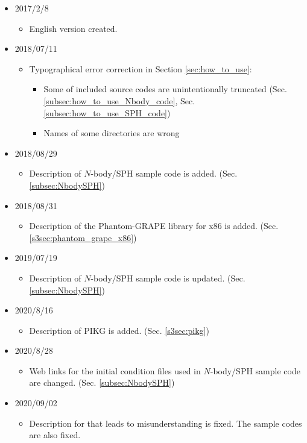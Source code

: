 \begin{itemize}
\item 2017/2/8
  \begin{itemize}
  \item English version created.
  \end{itemize}
\item 2018/07/11
  \begin{itemize}
  \item Typographical error correction in Section \ref{sec:how_to_use}:
    \begin{itemize}
    \item Some of included source codes are unintentionally truncated (Sec. \ref{subsec:how_to_use_Nbody_code}, Sec. \ref{subsec:how_to_use_SPH_code})
    \item Names of some directories are wrong
    \end{itemize}
  \end{itemize}
\item 2018/08/29
  \begin{itemize}
  \item Description of $N$-body/SPH sample code is added. (Sec. \ref{subsec:NbodySPH})
  \end{itemize}
\item 2018/08/31
  \begin{itemize}
  \item Description of the Phantom-GRAPE library for x86 is added. (Sec. \ref{s3sec:phantom_grape_x86})
  \end{itemize}
\item 2019/07/19
  \begin{itemize}
  \item Description of $N$-body/SPH sample code is updated. (Sec. \ref{subsec:NbodySPH})
  \end{itemize}
\item 2020/8/16
  \begin{itemize}
  \item Description of PIKG is added. (Sec. \ref{s3sec:pikg})
  \end{itemize}
\item 2020/8/28
  \begin{itemize}
  \item Web links for the initial condition files used in $N$-body/SPH sample code are changed. (Sec. \ref{subsec:NbodySPH})
  \end{itemize}
\item 2020/09/02
  \begin{itemize}
  \item Description for \initTree that leads to misunderstanding is fixed. The sample codes are also fixed.
  \end{itemize}
\end{itemize}
